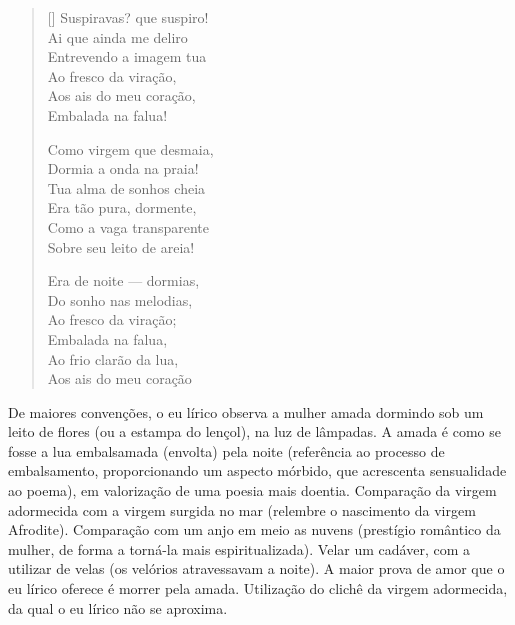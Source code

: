 \documentclass[12pt]{book}
\begin{document}
\begin{verse}[\versewidth]
						Suspiravas? que suspiro! \\
						Ai que ainda me deliro \\
						Entrevendo a imagem tua \\
						Ao fresco da viração, \\
						Aos ais do meu coração, \\
						Embalada na falua!
						
						Como virgem que desmaia, \\
						Dormia a onda na praia! \\
						Tua alma de sonhos cheia \\
						Era tão pura, dormente, \\
						Como a vaga transparente \\
						Sobre seu leito de areia!
						
						Era de noite — dormias, \\
						Do sonho nas melodias, \\
						Ao fresco da viração; \\
						Embalada na falua, \\
						Ao frio clarão da lua, \\
						Aos ais do meu coração \\
					\end{verse}
					\par De maiores convenções, o eu lírico observa a mulher amada dormindo sob um leito de flores (ou a estampa do lençol), na luz de lâmpadas. A amada é como se fosse a lua embalsamada (envolta) pela noite (referência ao processo de embalsamento, proporcionando um aspecto mórbido, que acrescenta sensualidade ao poema), em valorização de uma poesia mais doentia. Comparação da virgem adormecida com a virgem surgida no mar (relembre o nascimento da virgem Afrodite). Comparação com um anjo em meio as nuvens (prestígio romântico da mulher, de forma a torná-la mais espiritualizada). Velar um cadáver, com a utilizar de velas (os velórios atravessavam a noite). A maior prova de amor que o eu lírico oferece é morrer pela amada. Utilização do clichê da virgem adormecida, da qual o eu lírico não se aproxima.
					\settowidth{\versewidth}{E o eco ao longe murmurou — é ela!...}
\end{document}
